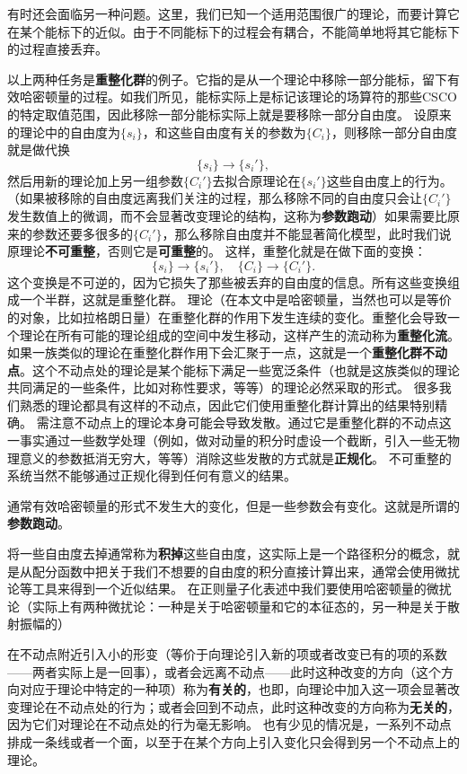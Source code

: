 \documentclass[hyperref, UTF8, a4paper]{ctexart}
\begin{document}
有时还会面临另一种问题。这里，我们已知一个适用范围很广的理论，而要计算它在某个能标下的近似。由于不同能标下的过程会有耦合，不能简单地将其它能标下的过程直接丢弃。

以上两种任务是\textbf{重整化群}的例子。它指的是从一个理论中移除一部分能标，留下有效哈密顿量的过程。如我们所见，能标实际上是标记该理论的场算符的那些CSCO的特定取值范围，因此移除一部分能标实际上就是要移除一部分自由度。
设原来的理论中的自由度为$\{s_i\}$，和这些自由度有关的参数为$\{C_i\}$，则移除一部分自由度就是做代换
\[
    \{s_i\} \longrightarrow \{s_i'\},
\]
然后用新的理论加上另一组参数$\{C_i'\}$去拟合原理论在$\{s_i'\}$这些自由度上的行为。（如果被移除的自由度远离我们关注的过程，那么移除不同的自由度只会让$\{C_i'\}$发生数值上的微调，而不会显著改变理论的结构，这称为\textbf{参数跑动}）如果需要比原来的参数还要多很多的$\{C_i'\}$，那么移除自由度并不能显著简化模型，此时我们说原理论\textbf{不可重整}，否则它是\textbf{可重整}的。
这样，重整化就是在做下面的变换：
\[
    \{s_i\} \longrightarrow \{s_i'\}, \quad \{C_i\} \longrightarrow \{C_i'\}.
\]
这个变换是不可逆的，因为它损失了那些被丢弃的自由度的信息。所有这些变换组成一个半群，这就是重整化群。
理论（在本文中是哈密顿量，当然也可以是等价的对象，比如拉格朗日量）在重整化群的作用下发生连续的变化。重整化会导致一个理论在所有可能的理论组成的空间中发生移动，这样产生的流动称为\textbf{重整化流}。如果一族类似的理论在重整化群作用下会汇聚于一点，这就是一个\textbf{重整化群不动点}。这个不动点处的理论是某个能标下满足一些宽泛条件（也就是这族类似的理论共同满足的一些条件，比如对称性要求，等等）的理论必然采取的形式。
很多我们熟悉的理论都具有这样的不动点，因此它们使用重整化群计算出的结果特别精确。
需注意不动点上的理论本身可能会导致发散。通过它是重整化群的不动点这一事实通过一些数学处理（例如，做对动量的积分时虚设一个截断，引入一些无物理意义的参数抵消无穷大，等等）消除这些发散的方式就是\textbf{正规化}。
不可重整的系统当然不能够通过正规化得到任何有意义的结果。

通常有效哈密顿量的形式不发生大的变化，但是一些参数会有变化。这就是所谓的\textbf{参数跑动}。

将一些自由度去掉通常称为\textbf{积掉}这些自由度，这实际上是一个路径积分的概念，就是从配分函数中把关于我们不想要的自由度的积分直接计算出来，通常会使用微扰论等工具来得到一个近似结果。
在正则量子化表述中我们要使用哈密顿量的微扰论（实际上有两种微扰论：一种是关于哈密顿量和它的本征态的，另一种是关于散射振幅的）

在不动点附近引入小的形变（等价于向理论引入新的项或者改变已有的项的系数——两者实际上是一回事），或者会远离不动点——此时这种改变的方向（这个方向对应于理论中特定的一种项）称为\textbf{有关的}，也即，向理论中加入这一项会显著改变理论在不动点处的行为；或者会回到不动点，此时这种改变的方向称为\textbf{无关的}，因为它们对理论在不动点处的行为毫无影响。
也有少见的情况是，一系列不动点排成一条线或者一个面，以至于在某个方向上引入变化只会得到另一个不动点上的理论。
\end{document}
